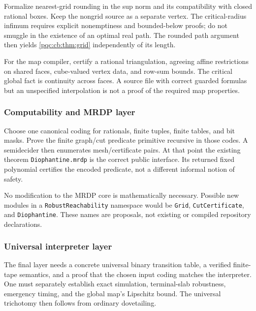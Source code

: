 \documentclass[11pt,letterpaper]{article}
\numberwithin{equation}{section}
\theoremstyle{definition}
\theoremstyle{remark}
\newcommand{\code}[1]{\nolinkurl{#1}}
\begin{document}
Formalize nearest-grid rounding in the sup norm and its compatibility with
closed rational boxes.  Keep the nongrid source as a separate vertex.  The
critical-radius infimum requires explicit nonemptiness and bounded-below
proofs; do not smuggle in the existence of an optimal real path.  The rounded
path argument then yields \cref{pqc:cb:thm:grid} independently of its length.

For the map compiler, certify a rational triangulation, agreeing affine
restrictions on shared faces, cube-valued vertex data, and row-sum bounds.
The critical global fact is continuity across faces.  A source file with
correct guarded formulas but an unspecified interpolation is not a proof of
the required map properties.

\subsubsection{Computability and MRDP layer}

Choose one canonical coding for rationals, finite tuples, finite tables, and
bit masks.  Prove the finite graph/cut predicate primitive recursive in those
codes.  A semidecider then enumerates mesh/certificate pairs.  At that point
the existing theorem \code{Diophantine.mrdp} is the correct public interface.
Its returned fixed polynomial certifies the encoded predicate, not a different
informal notion of safety.

No modification to the MRDP core is mathematically necessary.  Possible new modules in a
\code{RobustReachability} namespace would be \code{Grid},
\code{CutCertificate}, and \code{Diophantine}.  These names are proposals,
not existing or compiled repository declarations.

\subsubsection{Universal interpreter layer}

The final layer needs a concrete universal binary transition table, a verified
finite-tape semantics, and a proof that the chosen input coding matches the
interpreter.  One must separately establish exact simulation, terminal-slab
robustness, emergency timing, and the global map's Lipschitz bound.  The
universal trichotomy then follows from ordinary dovetailing.
\end{document}
